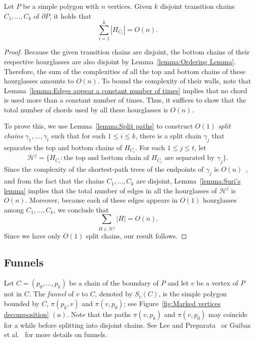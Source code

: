 \documentclass[a4paper,UKenglish]{lipics}
\newcommand{\fn}[2]{\ensuremath{S_{\scriptscriptstyle #1}(#2)}}
\newcommand{\p}[2]{\ensuremath{\pi(#1, #2)}}
\begin{document}
\begin{lemma}\label{lemma:Bounding complexity of hourglasses}
Let $P$ be a simple polygon with $n$ vertices.
Given $k$ disjoint transition chains $C_1, \ldots, C_k$  of $\partial P$, it holds that  $$\sum_{i=1}^k |H_{C_i}| = O(n).$$
\end{lemma}
\begin{proof}

Because the given transition chains are disjoint, the bottom chains of their respective hourglasses are also disjoint by Lemma~\ref{lemma:Ordering Lemma}. Therefore, the sum of the complexities of all the top and bottom chains of these hourglasses amounts to $O(n)$. 
To bound the complexity of their walls, note that
Lemma~\ref{lemma:Edges appear a constant number of times} implies that no chord is used more than a constant number of times. Thus, it suffices to show that the total number of chords used by all these hourglasses is $O(n)$.

To prove this, we use Lemma~\ref{lemma:Split paths} to construct $O(1)$ \emph{split chains} $\gamma_1, \ldots, \gamma_t$ such that for each $1\leq i\leq k$, there is a split chain $\gamma_j$ that separates the top and bottom chains of $H_{C_i}$.
For each $1\leq j\leq t$, let $$\mathcal H^j = \{H_{C_i} : \text{the top and bottom chain of $H_{C_i}$ are separated by }\gamma_j\}.$$
Since the complexity of the shortest-path trees of the endpoints of $\gamma_j$ is $O(n)$~\cite{guibasShortestPathTree},
and from the fact that the chains $C_1, \ldots, C_k$ are disjoint,  Lemma~\ref{lemma:Suri's lemma} implies that
the total number of edges in all the hourglasses of $\mathcal H^j$ is $O(n)$. Moreover, because each of these edges appears in $O(1)$ hourglasses among $C_1, \ldots, C_k$, we conclude that 
$$\sum_{H \in \mathcal H^j } |H| = O(n).$$
Since we have only $O(1)$ split chains, our result follows.
\end{proof}

\subsection{Funnels}

Let $C = (p_0, \ldots, p_k)$ be a chain of the boundary of $P$ and let $v$ be a vertex of $P$ not in $C$.
The \emph{funnel} of $v$ to $C$, denoted by $\fn{v}{C}$, is the simple polygon bounded by $C$, $\p{p_k}{v}$ and $\p{v}{p_0}$; see Figure~\ref{fig:Marked vertices decomposition} $(a)$. 
Note that the paths $\p{v}{p_k}$ and $\p{v}{p_0}$ may coincide for a while before splitting into disjoint chains. 
See Lee and Preparata~\cite{lee1984euclidean} or Guibas et al.~\cite{guibasShortestPathTree} for more details on funnels.
\end{document}
